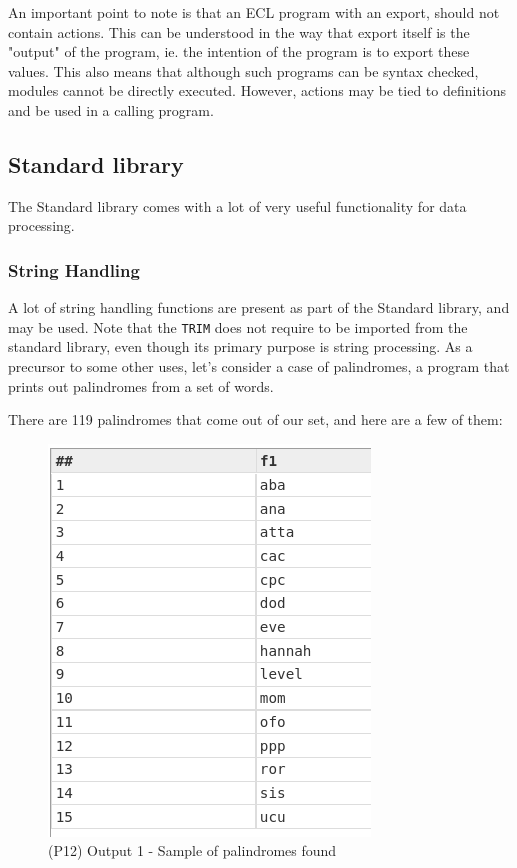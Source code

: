 \documentclass[a4paper,oneside,12pt]{book}
\begin{document}
An important point to note is that an ECL program with an export, should not contain actions. This can be understood in the way that export itself is the "output" of the program, ie. the intention of the program is to export these values. This also means that although such programs can be syntax checked, modules cannot be directly executed. However, actions may be tied to definitions and be used in a calling program.


\subsection{Standard library}

The Standard library comes with a lot of very useful functionality for data processing.

\subsubsection[String Handling]{String Handling}

A lot of string handling functions are present as part of the Standard library, and may be used. Note that the \lstinline{TRIM} does not require to be imported from the standard library, even though its primary purpose is string processing.
As a precursor to some other uses, let's consider a case of palindromes, a program that prints out palindromes from a set of words.




There are 119 palindromes that come out of our set, and here are a few of them:

\begin{figure}[h]
    \centering
    \includegraphics[width=.5\linewidth]{../output/76/1}
    \caption{(P12) Output 1 - Sample of palindromes found}
\end{figure}
\end{document}
